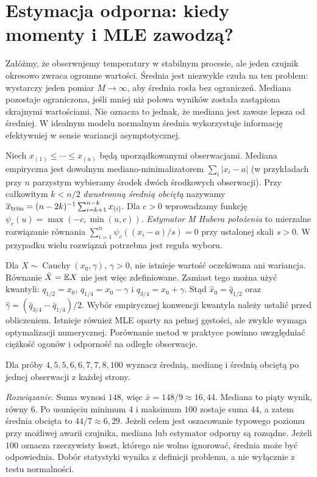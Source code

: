 \section{Estymacja odporna: kiedy momenty i MLE zawodzą?}
Załóżmy, że obserwujemy temperatury w stabilnym procesie, ale
jeden czujnik okresowo zwraca ogromne wartości. Średnia jest
niezwykle czuła na ten problem: wystarczy jeden pomiar $M\to\infty$,
aby średnia rosła bez ograniczeń. Mediana pozostaje ograniczona,
jeśli mniej niż połowa wyników została zastąpiona skrajnymi wartościami.
Nie oznacza to jednak, że mediana jest zawsze lepsza od średniej.
W idealnym modelu normalnym średnia wykorzystuje informację
efektywniej w sensie wariancji asymptotycznej.

\begin{definicja}
Niech $x_{(1)}\le\cdots\le x_{(n)}$ będą uporządkowanymi obserwacjami.
Mediana empiryczna jest dowolnym mediano-minimalizatorem
$\sum_i|x_i-a|$ (w przykładach przy $n$ parzystym wybieramy
środek dwóch środkowych obserwacji). Przy całkowitym $k<n/2$
\emph{dwustronną średnią obciętą} nazywamy
$\overline x_{\rm trim}=(n-2k)^{-1}\sum_{i=k+1}^{n-k}x_{(i)}$.
Dla $c>0$ wprowadzamy funkcję
$\psi_c(u)=\max(-c,\min(u,c))$. \emph{Estymator M Hubera położenia}
to mierzalne rozwiązanie równania
$\sum_{i=1}^n\psi_c((x_i-a)/s)=0$ przy ustalonej skali $s>0$.
W przypadku wielu rozwiązań potrzebna jest reguła wyboru.
\end{definicja}

\begin{przyklad}
Dla $X\sim\operatorname{Cauchy}(x_0,\gamma)$, $\gamma>0$,
nie istnieje wartość oczekiwana ani wariancja. Równanie
$\bar X=\mathbb E X$ nie jest więc zdefiniowane. Zamiast tego można
użyć kwantyli: $q_{1/2}=x_0$,
$q_{1/4}=x_0-\gamma$ i $q_{3/4}=x_0+\gamma$. Stąd
$\widehat x_0=\widehat q_{1/2}$ oraz
$\widehat\gamma=(\widehat q_{3/4}-\widehat q_{1/4})/2$.
Wybór empirycznej konwencji kwantyla należy ustalić przed
obliczeniem. Istnieje również MLE oparty na pełnej gęstości,
ale zwykle wymaga optymalizacji numerycznej. Porównanie metod
w praktyce powinno uwzględniać ciężkość ogonów i odporność
na odległe obserwacje.
\end{przyklad}

\begin{zadanie}
Dla próby $4,5,5,6,6,7,7,8,100$ wyznacz średnią, medianę
i średnią obciętą po jednej obserwacji z każdej strony.
\par\emph{Rozwiązanie.} Suma wynosi $148$, więc
$\bar x=148/9\approx16{,}44$. Mediana to piąty wynik, równy $6$.
Po usunięciu minimum $4$ i maksimum $100$ zostaje suma $44$,
a zatem średnia obcięta to $44/7\approx6{,}29$.
Jeżeli celem jest oszacowanie typowego poziomu przy możliwej
awarii czujnika, mediana lub estymator odporny są rozsądne.
Jeżeli $100$ oznacza rzeczywisty koszt, którego nie wolno ignorować,
średnia może być odpowiednia. Dobór statystyki wynika z definicji
problemu, a nie wyłącznie z testu normalności.
\end{zadanie}

